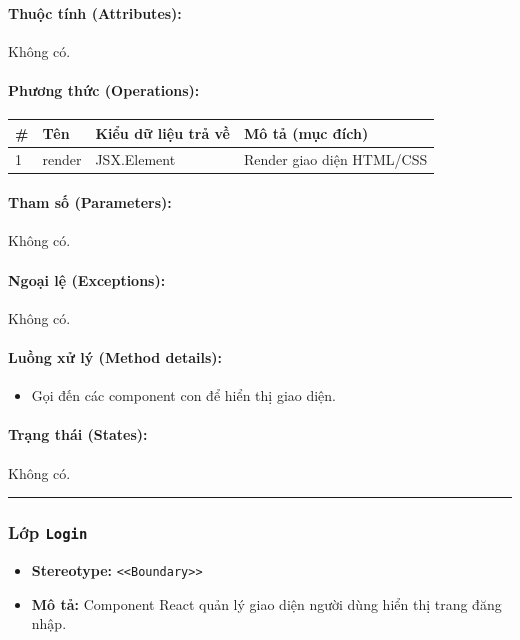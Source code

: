 \documentclass[12pt,a4paper]{article}
\begin{document}
\paragraph{Thuộc tính (Attributes):}
Không có.

\paragraph{Phương thức (Operations):}
\begin{longtable}{|p{0.6cm}|p{3.8cm}|p{2.6cm}|p{6.5cm}|}
\hline
\textbf{\#} & \textbf{Tên} & \textbf{Kiểu dữ liệu trả về} & \textbf{Mô tả (mục đích)} \\ \hline
\endhead
1 & render & JSX.Element & Render giao diện HTML/CSS \\ \hline
\end{longtable}

\paragraph{Tham số (Parameters):}
Không có.

\paragraph{Ngoại lệ (Exceptions):}
Không có.

\paragraph{Luồng xử lý (Method details):}
\begin{itemize}[leftmargin=*]
    \item Gọi đến các component con để hiển thị giao diện.
\end{itemize}


\paragraph{Trạng thái (States):}
Không có.

\vskip 0.5cm
\noindent\rule{\textwidth}{0.5pt}
\vskip 0.5cm

\subsubsection{Lớp \texttt{Login}}
\begin{itemize}[leftmargin=*]
    \item \textbf{Stereotype:} \texttt{\textless{}\textless{}Boundary\textgreater{}\textgreater{}}
    \item \textbf{Mô tả:} Component React quản lý giao diện người dùng hiển thị trang đăng nhập.
\end{itemize}
\end{document}
